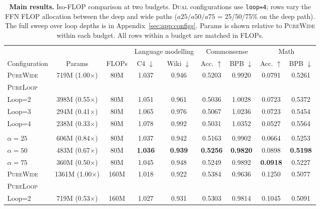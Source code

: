 \documentclass[11pt]{article}
\begin{document}
\begin{table}[t]
\centering
\caption{\textbf{Main results.} Iso-FLOP comparison at two budgets. \textsc{Dual} configurations use \texttt{loop=4}; rows vary the FFN FLOP allocation between the deep and wide paths ($a25/a50/a75$ = 25/50/75\% on the deep path). The full sweep over loop depths is in Appendix~\ref{sec:app:configs}. Params is shown relative to \textsc{PureWide} within each budget. All rows within a budget are matched in FLOPs.}
\label{tab:main}
\small
\setlength{\tabcolsep}{4pt}
\renewcommand{\arraystretch}{1.05}
\begin{tabular}{l c c cc cc cc}
\toprule
 & & & \multicolumn{2}{c}{Language modelling} & \multicolumn{2}{c}{Commonsense} & \multicolumn{2}{c}{Math} \\
\cmidrule(lr){4-5}\cmidrule(lr){6-7}\cmidrule(lr){8-9}
Configuration & Params & FLOPs & C4 $\downarrow$ & Wiki $\downarrow$ & Acc. $\uparrow$ & BPB $\downarrow$ & Acc. $\uparrow$ & BPB $\downarrow$ \\
\midrule
\textsc{PureWide} & 719M (1.00$\times$) & 80M & 1.037 & 0.946 & 0.5203 & 0.9920 & 0.0791 & 0.5261 \\
\multicolumn{9}{l}{\textsc{PureLoop}} \\
\quad Loop=2 & 398M (0.55$\times$) & 80M & 1.051 & 0.961 & 0.5036 & 1.0028 & 0.0723 & 0.5372 \\
\quad Loop=3 & 294M (0.41$\times$) & 80M & 1.065 & 0.976 & 0.5067 & 1.0236 & 0.0723 & 0.5454 \\
\quad Loop=4 & 238M (0.33$\times$) & 80M & 1.078 & 0.992 & 0.5031 & 1.0352 & 0.0527 & 0.5564 \\
\rowcolor{oursrow}
\multicolumn{9}{l}{\textsc{DualPath} \emph{(ours)}} \\
\rowcolor{oursrow}
\quad $\alpha=25$ & 606M (0.84$\times$) & 80M & 1.037 & 0.942 & 0.5163 & 0.9902 & 0.0664 & 0.5253 \\
\rowcolor{oursrow}
\quad $\alpha=50$ & 483M (0.67$\times$) & 80M & \textbf{1.036} & \textbf{0.939} & \textbf{0.5256} & \textbf{0.9820} & 0.0898 & \textbf{0.5198} \\
\rowcolor{oursrow}
\quad $\alpha=75$ & 360M (0.50$\times$) & 80M & 1.045 & 0.948 & 0.5249 & 0.9892 & \textbf{0.0918} & 0.5227 \\
\midrule
\textsc{PureWide} & 1361M (1.00$\times$) & 160M & 1.018 & 0.922 & 0.5384 & 0.9636 & 0.1250 & 0.5077 \\
\multicolumn{9}{l}{\textsc{PureLoop}} \\
\quad Loop=2 & 719M (0.53$\times$) & 160M & 1.027 & 0.931 & 0.5303 & 0.9814 & 0.1045 & 0.5091 \\

\end{tabular}
\end{table}
\end{document}
